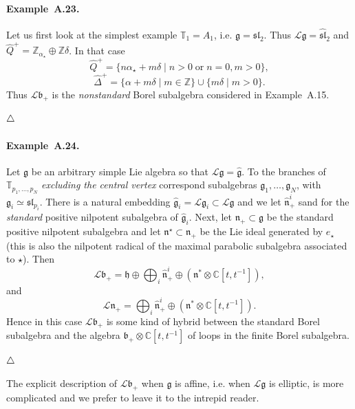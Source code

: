 \documentclass[a4paper,10pt]{amsart}
\def\Z{\mathbb{Z}}
\def\endexample{$\hfill \triangle$}
\def\a{\alpha}
\def\C{\mathbb{C}}
\def\g{\mathfrak{g}}
\def\bo{\mathfrak{b}}
\def\h{\mathfrak{h}}
\def\n{\mathfrak{n}}
\numberwithin{equation}{section}
\begin{document}
{\vspace{.15in}

\addtocounter{theo}{1}

\paragraph{\textbf{Example~A.23.}} Let us first look at the simplest example $\mathbb{T}_1=A_1$, i.e. $\g=\mathfrak{sl}_2$. Thus $\mathcal{L}\g=\widehat{\mathfrak{sl}}_2$ and $\widehat{Q}^+=\Z_{\a_{\star}} \oplus \Z\delta$. In that case
$$\widehat{Q}^+=\{n\a_{\star}+m\delta\;|\; n>0\;\text{or}\; n=0, m>0\},$$
$$\widehat{\Delta}^+=\{\a+m\delta\;|\;m \in \Z\} \cup \{m\delta\;|\; m >0\}.$$
Thus $\mathcal{L}\bo_+$ is the \textit{nonstandard} Borel subalgebra considered in Example~A.15.

\endexample

\vspace{.15in}

\addtocounter{theo}{1}

\paragraph{\textbf{Example~A.24.}} Let $\g$ be an arbitrary simple Lie algebra so that $\mathcal{L}\g=\widehat{\g}$. To the branches of $\mathbb{T}_{p_1, \ldots, p_N}$ \textit{excluding the central vertex} correspond subalgebras $\g_1, \ldots, \g_N$, with $\g_i \simeq \mathfrak{sl}_{p_i}$.
There is a natural embedding $\widehat{\g}_i=\mathcal{L}\g_i \subset \mathcal{L}\g$ and we let $\widehat{\n}_+^i $ sand for the \textit{standard} positive nilpotent subalgebra of $\widehat{\g}_i$. Next, let $\n_+ \subset \g$ be the standard positive nilpotent subalgebra and let $\n^{\star}\subset \n_+$ be the Lie ideal generated by $e_{\star}$ (this is also the nilpotent radical of the maximal parabolic subalgebra associated to $\star$). Then
$$\mathcal{L}\bo_+=\h \oplus\bigoplus_i \widehat{\n}_+^i \oplus (\n^*\otimes \C[t,t^{-1}]),$$
and
$$\mathcal{L}\n_+=\bigoplus_i \widehat{\n}_+^i\oplus (\n^*\otimes \C[t,t^{-1}]) .$$
Hence in this case $\mathcal{L}\bo_+$ is some kind of hybrid between the standard Borel subalgebra and the algebra $\bo_+\otimes \C[t,t^{-1}]$ of loops in the finite Borel subalgebra.

\endexample

\vspace{.1in}

The explicit description of $\mathcal{L}\bo_+$ when $\g$ is affine, i.e. when $\mathcal{L}\g$ is elliptic, is more complicated and we prefer to leave it to the intrepid reader.

}
\end{document}
